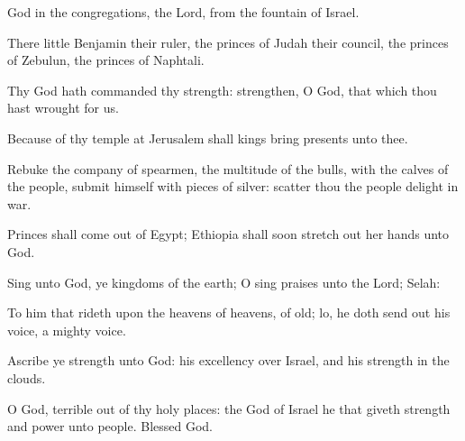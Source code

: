 {God in the
congregations,
{} the
Lord, from the
fountain of
Israel.
\par }{\Q {}There
{}
little
Benjamin
{} their
ruler, the
princes of
Judah
{} their
council, the
princes of
Zebulun,
{} the
princes of
Naphtali.
\par }{\Q {}Thy
God hath
commanded thy
strength:
strengthen, O
God, that
which thou hast
wrought for us.
\par }{\Q {}Because of thy
temple at
Jerusalem shall
kings
bring
presents unto thee.
\par }{\Q {}Rebuke the
company of
spearmen, the
multitude of the
bulls, with the
calves of the
people,
{}
submit himself with
pieces of
silver:
scatter thou the
people
{}
delight in
war.
\par }{\Q {}Princes shall come
out of
Egypt;
Ethiopia shall soon stretch
out her
hands unto
God.
\par }{\BB \par }{\Q {}Sing unto
God, ye
kingdoms of the
earth; O sing
praises unto the
Lord;
Selah:
\par }{\Q {}To him that
rideth upon the
heavens of
heavens,
{} of
old; lo, he doth send
out his
voice,
{} a
mighty
voice.
\par }{\Q {}Ascribe ye
strength unto
God: his
excellency
{} over
Israel, and his
strength
{} in the
clouds.
\par }{\Q {}O
God,
{}
terrible out of thy holy
places: the
God of
Israel
{} he that
giveth
strength and
power unto
{}
people.
Blessed
{}
God.

}
